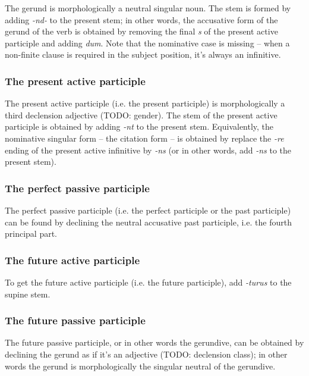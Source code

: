 \documentclass[a4paper, oneside, 12pt]{report}
\newcommand{\form}[1]{\emph{#1}}
\begin{document}
The gerund is morphologically a neutral singular noun.
The stem is formed by 
adding \form{-nd-} to the present stem;
in other words, 
the accusative form of the gerund of the verb 
is obtained by removing the final \form{s} 
of the present active participle 
and adding \form{dum}.
Note that the nominative case is missing -- 
when a non-finite clause is required in the subject position,
it's always an infinitive.

\subsubsection{The present active participle}

The present active participle (i.e. the present participle) 
is morphologically a third declension adjective (TODO: gender).
The stem of the present active participle 
is obtained by adding \form{-nt} to the present stem.
Equivalently, the nominative singular form -- the citation form --
is obtained by replace the \form{-re} ending of the present active infinitive by \form{-ns}
(or in other words, add \form{-ns} to the present stem).

\subsubsection{The perfect passive participle}

The perfect passive participle (i.e. the perfect participle or the past participle)
can be found by declining the neutral accusative past participle, 
i.e. the fourth principal part.

\subsubsection{The future active participle}

To get the future active participle (i.e. the future participle), add \form{-turus} to the supine stem.

\subsubsection{The future passive participle}\label{sec:verb-inflection.non-finite.future-passive}

The future passive participle, 
or in other words the gerundive,
can be obtained by declining the gerund 
as if it's an adjective (TODO: declension class);
in other words the gerund is morphologically the singular neutral of the gerundive.
\end{document}
